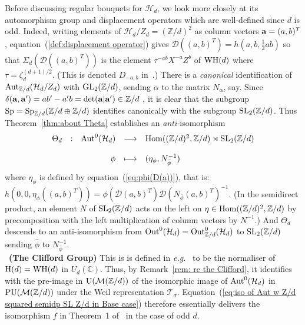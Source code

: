 \documentclass[12pt]{article}
\newcommand{\Aut}{{\rm Aut}}
\newcommand{\ba}{\ensuremath{{\bf a}}}
\newcommand{\bbC}{\ensuremath{\mathbb{C}}}\newcommand{\bbCp}{\ensuremath{\mathbb{C}_p}}
\newcommand{\bbF}{\ensuremath{\mathbb{F}}}
\newcommand{\bbZ}{\ensuremath{\mathbb{Z}}}
\newcommand{\cD}{\ensuremath{\mathcal{D}}}
\newcommand{\cH}{\ensuremath{\mathcal{H}}}
\newcommand{\cM}{\mathcal{M}}
\newcommand{\cT}{\ensuremath{\mathcal{T}}}
\newcommand{\displaymapdef}[5]
{
	\begin{array}{rcrcl}
		#1 &:& #2 &\longrightarrow& #3 \\
		& &    &                    \\
		& & #4 &\longmapsto    & #5
	\end{array}
}
\newcommand{\eg}{\emph{e.g.}}
\newcommand{\GL}{{\rm GL}}
\newcommand{\half}{\frac{1}{2}}
\newcommand{\Hom}{{\rm Hom}}
\newcommand{\inv}{^{-1}}%
\newcommand{\Out}{{\rm Out}}
\renewcommand{\rem}{\refstepcounter{rem}\noindent{\sc Remark \therem}}
\newcommand{\SL}{{\rm SL}}
\newcommand{\Sp}{{\rm Sp}}
\renewcommand{\therem}{\thesection.\arabic{rem}}
\newcommand{\U}{{\rm U}}
\newcommand{\Zover}[1]{\ensuremath{\bbZ/#1}}
\begin{document}
Before discussing regular bouquets for $\cH_d$, we look more closely at its automorphism group and displacement operators which are well-defined since $d$ is odd. Indeed, writing elements of $\cH_d/Z_d=(\Zover{d})^2$ as column vectors $\ba=(a,b)^T$, equation~(\ref{def:displacement operator}) gives  
$\cD((a,b)^T)=h(a,b,\half ab)$ so that  $\Sigma_d(\cD((a,b)^T))$
is the element $\tau^{-ab}
X^{-a}Z^b
$
of ${\rm WH}(d)$ where $\tau=\zeta_d^{(d+1)/2}$. (This is denoted 
$D_{-a,b}$ in~\cite{Kopp IMRN}.) 
There is a 
{\em canonical} identification of $\Aut_{\Zover{d}}(\cH_d/Z_d)$ with $\GL_2(\Zover{d})$, sending $\alpha$ to the matrix $N_{\alpha}$, say. Since  $\delta(\ba,\ba')=ab'-a'b=\det(\ba|\ba')\in\Zover{d}$ , it is clear that the subgroup  $\Sp=\Sp_{\Zover{d}}(\Zover{d}\oplus \Zover{d})$ identifies canonically with the subgroup $\SL_2(\Zover{d})$. Thus  Theorem~\ref{thm:about Theta} 
establishes an\textit{ anti-}isomorphism 
\begin{equation}\label{eq:iso of Aut w  Z/d squared semidp SL Z/d in Base case}
	\displaymapdef
	{\Theta_d}
	{\Aut^0(\cH_d)}
	{\Hom((\Zover{d})^2,\Zover{d})\rtimes \SL_2(\Zover{d})}
	{\phi}
	{(\eta_\phi, N_{\bar \phi}\inv)}
\end{equation}
where $\eta_\phi$ is defined by equation~(\ref{eq:phi(D(a))}), that is:  $h(0,0,\eta_\phi((a,b)^T))=\phi(\cD(a,b)^T)\cD(N_{\bar \phi}(a,b)^T)\inv$. (In the semidirect product, an element $N$ of $\SL_2(\Zover{d})$ acts on the left on $\eta\in \Hom((\Zover{d})^2,\Zover{d})$ by precomposition with the left multiplication of column vectors by $N\inv$.) And $\Theta_d$ descends to an anti-isomorphism from $\Out^0(\cH_d)=\Out_{\Zover{d}}^0(\cH_d)$ to $\SL_2(\Zover{d})$ sending $\hat \phi$ to $N_{\bar \phi}\inv$.\bigskip\\
\rem\label{rem:TheCliffordGroupandTheExtCG}\ {\bf (The Clifford Group)}
This is is defined in \eg~\cite{DMA: SICPOVMs and the ECG} to be the normaliser of ${\rm H}(d)={\rm WH}(d)$  in $U_d(\bbC)$. Thus, by Remark~\ref{rem: re the Clifford}, it   identifies with the pre-image in $\U(\cM(\Zover{d}))$ of the isomorphic image of $\Aut^0(\cH_d)$ in ${\rm PU}(\cM(\Zover{d}))$ under the Weil representation  $\cT_{\sigma}$. Equation~(\ref{eq:iso of Aut w  Z/d squared semidp SL Z/d in Base case}) therefore essentially delivers the isomorphism $f$ in Theorem~1 of~\cite{DMA: SICPOVMs and the ECG} in the case of odd $d$. 
\end{document}
